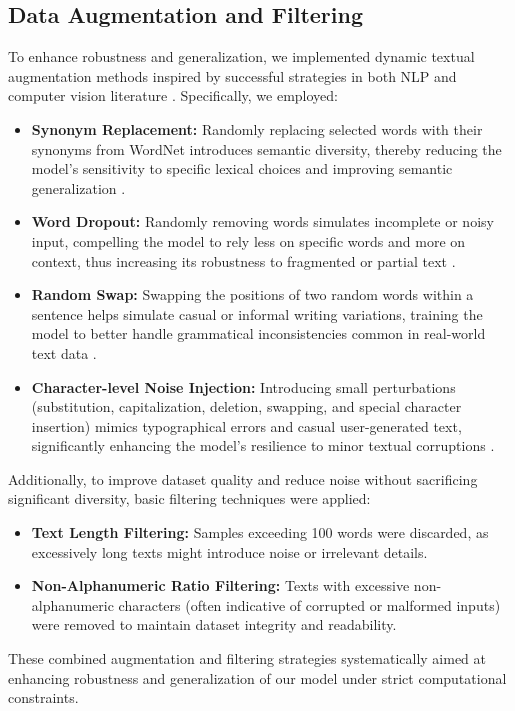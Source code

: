 \documentclass[letterpaper]{article}
\begin{document}
\subsection{Data Augmentation and Filtering}
To enhance robustness and generalization, we implemented dynamic textual augmentation methods inspired by successful strategies in both NLP and computer vision literature \cite{wei2019eda, cubuk2019autoaugment}. Specifically, we employed:
\begin{itemize}
    \item \textbf{Synonym Replacement:} Randomly replacing selected words with their synonyms from WordNet introduces semantic diversity, thereby reducing the model's sensitivity to specific lexical choices and improving semantic generalization \cite{zhang2015character}.

    \item \textbf{Word Dropout:} Randomly removing words simulates incomplete or noisy input, compelling the model to rely less on specific words and more on context, thus increasing its robustness to fragmented or partial text \cite{iyyer2015deep}.

    \item \textbf{Random Swap:} Swapping the positions of two random words within a sentence helps simulate casual or informal writing variations, training the model to better handle grammatical inconsistencies common in real-world text data \cite{wei2019eda}.

    \item \textbf{Character-level Noise Injection:} Introducing small perturbations (substitution, capitalization, deletion, swapping, and special character insertion) mimics typographical errors and casual user-generated text, significantly enhancing the model's resilience to minor textual corruptions \cite{belinkov2018synthetic}.
\end{itemize}

Additionally, to improve dataset quality and reduce noise without sacrificing significant diversity, basic filtering techniques were applied:
\begin{itemize}
    \item \textbf{Text Length Filtering:} Samples exceeding 100 words were discarded, as excessively long texts might introduce noise or irrelevant details.
    \item \textbf{Non-Alphanumeric Ratio Filtering:} Texts with excessive non-alphanumeric characters (often indicative of corrupted or malformed inputs) were removed to maintain dataset integrity and readability.
\end{itemize}
These combined augmentation and filtering strategies systematically aimed at enhancing robustness and generalization of our model under strict computational constraints.
\end{document}
